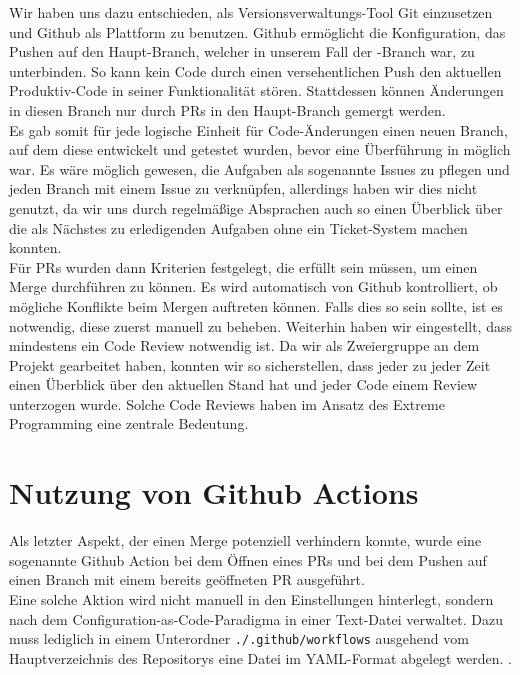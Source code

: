 Wir haben uns dazu entschieden, als Versionsverwaltungs-Tool Git  einzusetzen und Github als Plattform zu
benutzen.
Github ermöglicht die Konfiguration, das Pushen auf den Haupt-Branch, welcher in unserem Fall der -Branch war,
zu unterbinden. 
So kann kein Code durch einen versehentlichen Push den aktuellen Produktiv-Code in seiner Funktionalität stören.
Stattdessen können Änderungen in diesen Branch nur durch \ac{PR}s in den Haupt-Branch gemergt werden. \\

Es gab somit für jede logische Einheit für Code-Änderungen einen neuen Branch, auf dem diese entwickelt und getestet
wurden, bevor eine Überführung in  möglich war. 
Es wäre möglich gewesen, die Aufgaben als sogenannte Issues zu pflegen und jeden Branch mit einem Issue zu verknüpfen,
allerdings haben wir dies nicht genutzt, da wir uns durch regelmäßige Absprachen auch so einen Überblick über die
als Nächstes zu erledigenden Aufgaben ohne ein Ticket-System machen konnten. \\

Für \ac{PR}s wurden dann Kriterien festgelegt, die erfüllt sein müssen, um einen Merge durchführen zu können.
Es wird automatisch von Github kontrolliert, ob mögliche Konflikte beim Mergen auftreten können.
Falls dies so sein sollte, ist es notwendig, diese zuerst manuell zu beheben.
Weiterhin haben wir eingestellt, dass mindestens ein Code Review notwendig ist.
Da wir als Zweiergruppe an dem Projekt gearbeitet haben, konnten wir so sicherstellen, dass jeder zu jeder Zeit einen
Überblick über den aktuellen Stand hat und jeder Code einem Review unterzogen wurde.
Solche Code Reviews haben \bspw im Ansatz des Extreme Programming eine zentrale Bedeutung. 

\section{Nutzung von Github Actions}
\label{sec:github-actions}

Als letzter Aspekt, der einen Merge potenziell verhindern konnte, wurde eine sogenannte Github Action bei dem Öffnen
eines \ac{PR}s und bei dem Pushen auf einen Branch mit einem bereits geöffneten \ac{PR} ausgeführt. \\

Eine solche Aktion wird nicht manuell in den Einstellungen hinterlegt, sondern nach dem
Configuration-as-Code-Paradigma in einer Text-Datei verwaltet.
Dazu muss lediglich in einem Unterordner \texttt{./.github/workflows} ausgehend vom Hauptverzeichnis des Repositorys
eine Datei im YAML-Format abgelegt werden.  . \\

